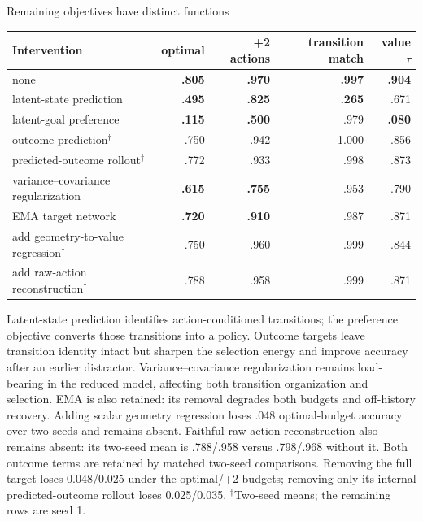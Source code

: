 \documentclass[aspectratio=169,10pt]{beamer}
\newcommand{\good}[1]{\textcolor{cgreen}{\textbf{#1}}}
\newcommand{\bad}[1]{\textcolor{cred}{\textbf{#1}}}
\begin{document}
\begin{frame}{Remaining objectives have distinct functions}
\footnotesize
\centering
\begin{tabular}{lrrrr}
\toprule
Intervention & optimal & +2 actions & transition match & value $\tau$\\
\midrule
none & \good{.805} & \good{.970} & \good{.997} & \good{.904}\\
latent-state prediction & \bad{.495} & \bad{.825} & \bad{.265} & .671\\
latent-goal preference & \bad{.115} & \bad{.500} & .979 & \bad{.080}\\
outcome prediction$^{\dagger}$ & .750 & .942 & 1.000 & .856\\
predicted-outcome rollout$^{\dagger}$ & .772 & .933 & .998 & .873\\
variance--covariance regularization & \bad{.615} & \bad{.755} & .953 & .790\\
EMA target network & \bad{.720} & \bad{.910} & .987 & .871\\
add geometry-to-value regression$^{\dagger}$ & .750 & .960 & .999 & .844\\
add raw-action reconstruction$^{\dagger}$ & .788 & .958 & .999 & .871\\
\bottomrule
\end{tabular}

\medskip
\raggedright
Latent-state prediction identifies action-conditioned transitions; the
preference objective converts those transitions into a policy. Outcome
targets leave transition identity intact but sharpen the selection energy and
improve accuracy after an earlier distractor. Variance--covariance
regularization remains load-bearing in the reduced model, affecting both
transition organization and selection. EMA is also retained: its removal
degrades both budgets and off-history recovery. Adding scalar geometry
regression loses .048 optimal-budget accuracy over two seeds and remains absent. Faithful
raw-action reconstruction also remains absent: its two-seed mean is
.788/.958 versus .798/.968 without it. Both outcome
terms are retained by matched two-seed comparisons. Removing the
full target loses 0.048/0.025 under the optimal/+2 budgets; removing only its internal
predicted-outcome rollout loses 0.025/0.035. $^{\dagger}$Two-seed means; the
remaining rows are seed 1.
\end{frame}
\end{document}
